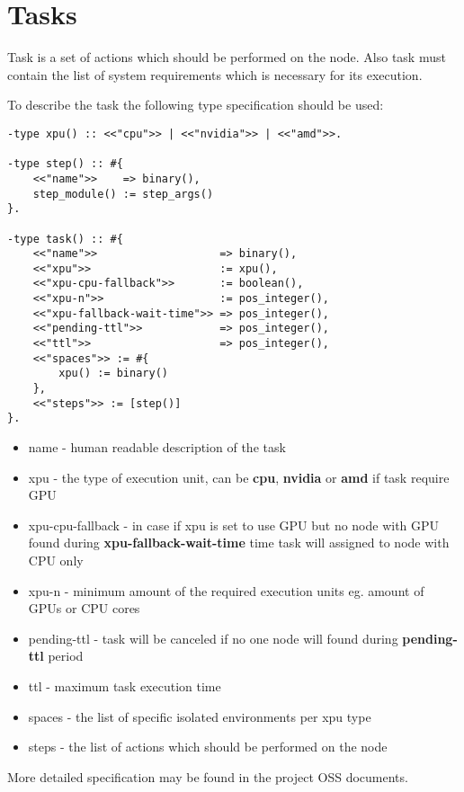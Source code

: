 \section{Tasks}

Task is a set of actions which should be performed on the node.
Also task must contain the list of system requirements which is necessary for its execution.

To describe the task the following type specification should be used:

\begin{verbatim}
-type xpu() :: <<"cpu">> | <<"nvidia">> | <<"amd">>.

-type step() :: #{
    <<"name">>    => binary(),
    step_module() := step_args()
}.

-type task() :: #{
    <<"name">>                   => binary(),
    <<"xpu">>                    := xpu(),
    <<"xpu-cpu-fallback">>       := boolean(),
    <<"xpu-n">>                  := pos_integer(),
    <<"xpu-fallback-wait-time">> => pos_integer(),
    <<"pending-ttl">>            => pos_integer(),
    <<"ttl">>                    => pos_integer(),
    <<"spaces">> := #{
        xpu() := binary()
    },
    <<"steps">> := [step()]
}.
\end{verbatim}

\begin{itemize}
    \item name - human readable description of the task
    \item xpu - the type of execution unit, can be \textbf{cpu}, \textbf{nvidia} or \textbf{amd} if task require GPU
    \item xpu-cpu-fallback - in case if xpu is set to use GPU but no node with GPU found during \textbf{xpu-fallback-wait-time} time task will assigned to node with CPU only
    \item xpu-n - minimum amount of the required execution units eg. amount of GPUs or CPU cores
    \item pending-ttl - task will be canceled if no one node will found during \textbf{pending-ttl} period
    \item ttl - maximum task execution time
    \item spaces - the list of specific isolated environments per xpu type
    \item steps - the list of actions which should be performed on the node
\end{itemize}

More detailed specification may be found in the project OSS\cite{oss} documents.

